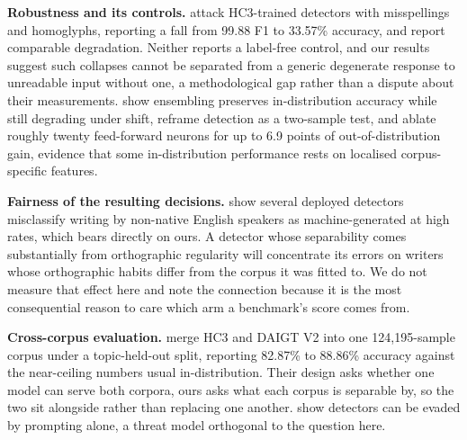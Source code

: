 \textbf{Robustness and its controls.} \citet{Antoun2023towards} attack HC3-trained detectors with misspellings and homoglyphs, reporting a fall from 99.88 F1 to 33.57\% accuracy, and \citet{Huang2024generated} report comparable degradation. Neither reports a label-free control, and our results suggest such collapses cannot be separated from a generic degenerate response to unreadable input without one, a methodological gap rather than a dispute about their measurements. \citet{Lai2024adaptive} show ensembling preserves in-distribution accuracy while still degrading under shift, \citet{Zhang2024detecting} reframe detection as a two-sample test, and \citet{Borile2025generalize} ablate roughly twenty feed-forward neurons for up to 6.9 points of out-of-distribution gain, evidence that some in-distribution performance rests on localised corpus-specific features.

\textbf{Fairness of the resulting decisions.} \citet{Liang2023gpt} show several deployed detectors misclassify writing by non-native English speakers as machine-generated at high rates, which bears directly on ours. A detector whose separability comes substantially from orthographic regularity will concentrate its errors on writers whose orthographic habits differ from the corpus it was fitted to. We do not measure that effect here and note the connection because it is the most consequential reason to care which arm a benchmark's score comes from.

\textbf{Cross-corpus evaluation.} \citet{Alikhanov2026generated} merge HC3 and DAIGT V2 into one 124,195-sample corpus under a topic-held-out split, reporting 82.87\% to 88.86\% accuracy against the near-ceiling numbers usual in-distribution. Their design asks whether one model can serve both corpora, ours asks what each corpus is separable by, so the two sit alongside rather than replacing one another. \citet{Lu2023large} show detectors can be evaded by prompting alone, a threat model orthogonal to the question here.

